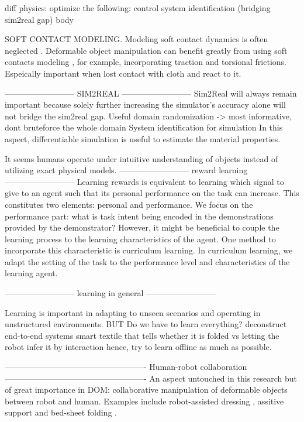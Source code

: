 \documentclass[\home/main.tex]{subfiles}
\begin{document}
diff physics:
    optimize the following:
        control
        system identification  (bridging sim2real gap)
        body 
 

SOFT CONTACT MODELING. 
Modeling soft contact dynamics is often neglected \autocite{Matas2018, seita2021learning,jangir2020dynamic}. Deformable object manipulation can benefit greatly from using soft contacts modeling \autocite{Kao2004,Siciliano2008}, for example, incorporating traction and torsional frictions. Espeically important when lost contact with cloth and react to it. 

--------------------------
    SIM2REAL
--------------------------
Sim2Real will always remain important because solely further increasing the simulator's accuracy alone will not bridge the sim2real gap.
Useful domain randomization -> most informative, dont bruteforce the whole domain 
System identification for simulation 
    In this aspect, differentiable simulation is useful to estimate the material properties.

It seems humans operate under intuitive understanding of objects instead of utilizing exact physical models. \autocite{Baillargeon2011}
--------------------------
    reward learning
--------------------------
Learning rewards is equivalent to learning which signal to give to an agent such that its personal performance on the task can increase. This constitutes two elements: personal and performance. We focus on the performance part: what is task intent being encoded in the demonstrations provided by the demonstrator? However, it might be beneficial to couple the learning process to the learning characteristics of the agent. One method to incorporate this characteristic is curriculum learning. In curriculum learning, we adapt the setting of the task to the performance level and characteristics of the learning agent.  

--------------------------
    learning in general
--------------------------

Learning is important in adapting to unseen scenarios and operating in unstructured environments. 
BUT
Do we have to learn everything?
    deconstruct end-to-end systems
    smart textile that tells whether it is folded vs letting the robot infer it by interaction 
        hence, try to learn offline as much as possible. 


 ----------------------------------------------------
    Human-robot collaboration
----------------------------------------------------
An aspect untouched in this research but of great importance in DOM: collaborative manipulation of deformable objects between robot and human. Examples include robot-assisted dressing \autocite{Gao2016}, assitive support \autocite{lu2017human} and bed-sheet folding \autocite{Kruse2015}.
\end{document}
